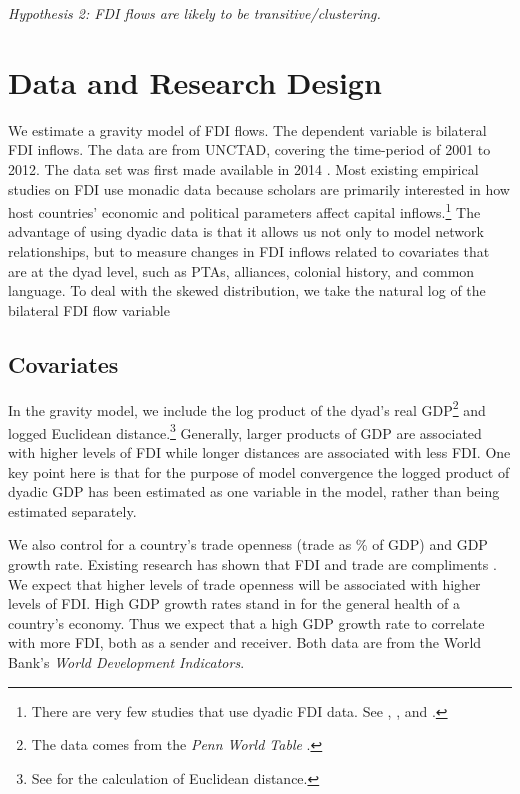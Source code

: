 \documentclass[12pt]{article}
\begin{document}
\textit{Hypothesis 2: FDI flows are likely to be transitive/clustering.}






\section{Data and Research Design}


We estimate a gravity model of FDI flows. The dependent variable is bilateral FDI inflows. The data are from UNCTAD, covering the time-period of 2001 to 2012. The data set was first made available in 2014 \citep{UNCTAD:2014}. Most existing empirical studies on FDI use monadic data because scholars are primarily interested in how host countries' economic and political parameters affect capital inflows.\footnote{There are very few studies that use dyadic FDI data. See \citet{Frenkel_et_al:2004}, \citet{Li_Vashchilko:2010}, and \citet{Razin_et_al:2005}. } The advantage of using dyadic data is that it allows us not only to model network relationships, but to measure changes in FDI inflows related to covariates that are at the dyad level, such as PTAs, alliances, colonial history, and common language. To deal with the skewed distribution, we take the natural log of the bilateral FDI flow variable

\subsection{Covariates}

In the gravity model, we include the log product of the dyad's real GDP\footnote{The data comes from the \textit{Penn World Table}  \citep{feenstra2015next}.} and logged Euclidean distance.\footnote{See \citet{mayer2011notes} for the calculation of Euclidean distance.} Generally, larger products of GDP are associated with higher levels of FDI while longer distances are associated with less FDI. One key point here is that for the purpose of model convergence the logged product of dyadic GDP has been estimated as one variable in the model, rather than being estimated separately.

We also control for a country's trade openness (trade as \% of GDP) and GDP growth rate. Existing research has shown that FDI and trade are compliments \citep{aizenman2006fdi}. We expect that higher levels of trade openness will be associated with higher levels of FDI. High GDP growth rates stand in for the general health of a country's economy. Thus we expect that a high GDP growth rate to correlate with more FDI, both as a sender and receiver. Both data are from the World Bank's \textit{World Development Indicators}.
\end{document}
